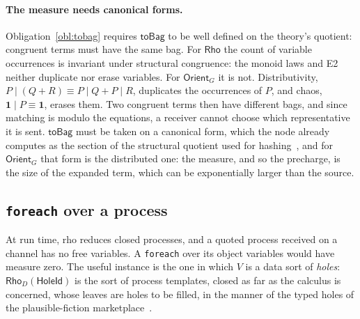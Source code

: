 \documentclass[11pt]{article}
\theoremstyle{branddef}
\theoremstyle{brandplain}
\theoremstyle{brandrem}
\newcommand{\rhoc}{\textsf{rho}}
\newcommand{\chaos}{\mathbf{1}}
\newcommand{\fe}{\texttt{foreach}}
\begin{document}
\paragraph{The measure needs canonical forms.} Obligation~\ref{obl:tobag}
requires \(\mathsf{toBag}\) to be well defined on the theory's quotient:
congruent terms must have the same bag. For \(\mathsf{Rho}\) the count of
variable occurrences is invariant under structural congruence: the monoid laws
and E2 neither duplicate nor erase variables. For \(\mathsf{Orient}_G\) it is
not. Distributivity, \(P\mid(Q+R)\equiv P\mid Q + P\mid R\), duplicates the
occurrences of \(P\), and chaos, \(\chaos\mid P\equiv\chaos\), erases them. Two
congruent terms then have different bags, and since matching is modulo the
equations, a receiver cannot choose which representative it is sent.
\(\mathsf{toBag}\) must be taken on a canonical form, which the node already
computes as the section of the structural quotient used for
hashing~\cite{f1r3nodeOTE}, and for \(\mathsf{Orient}_G\) that form is the
distributed one: the measure, and so the precharge, is the size of the expanded
term, which can be exponentially larger than the source.

\subsection{\texttt{foreach} over a process}

At run time, \rhoc{} reduces closed processes, and a quoted process received on
a channel has no free variables. A \fe{} over its object variables would have
measure zero. The useful instance is the one in which \(V\) is a data sort of
\emph{holes}: \(\mathsf{Rho}_D(\mathsf{HoleId})\) is the sort of process
templates, closed as far as the calculus is concerned, whose leaves are holes
to be filled, in the manner of the typed holes of the plausible-fiction
marketplace~\cite{PF}.
\end{document}
